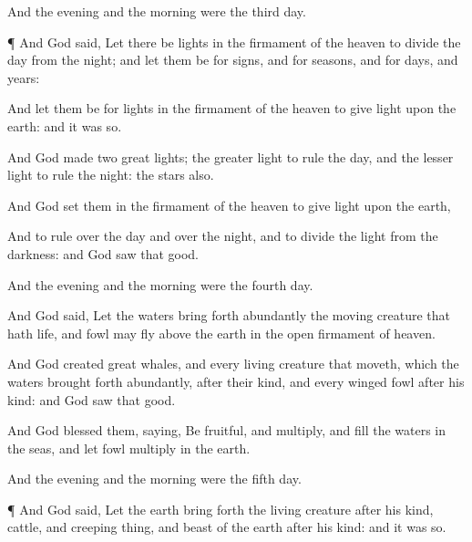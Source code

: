 {And the
evening and the
morning were the
third
day.


\par }{\PP {}¶ And
God
said, Let there be
lights in the
firmament of the
heaven to
divide the
day from the
night; and let them be for
signs, and for
seasons, and for
days, and
years:

And let them be for
lights in the
firmament of the
heaven to give
light upon the
earth: and it was so.

And
God
made
two
great
lights; the
greater
light to
rule the
day, and the
lesser
light to
rule the
night:
{} the
stars also.

And
God
set them in the
firmament of the
heaven to give
light upon the
earth,

And to
rule over the
day and over the
night, and to
divide the
light from the
darkness: and
God
saw that
{}
good.

And the
evening and the
morning were the
fourth
day.


\par }{\PP {}And
God
said, Let the
waters bring forth
abundantly the moving
creature that
hath
life, and
fowl
{} may
fly
above the
earth in the
open
firmament of
heaven.

And
God
created
great
whales, and every
living
creature that
moveth, which the
waters brought forth
abundantly, after their
kind, and every
winged
fowl after his
kind: and
God
saw that
{}
good.

And
God
blessed them,
saying, Be
fruitful, and
multiply, and
fill the
waters in the
seas, and let
fowl
multiply in the
earth.

And the
evening and the
morning were the
fifth
day.


\par }{\PP {}¶ And
God
said, Let the
earth bring
forth the
living
creature after his
kind,
cattle, and creeping
thing, and
beast of the
earth after his
kind: and it was so.

}
